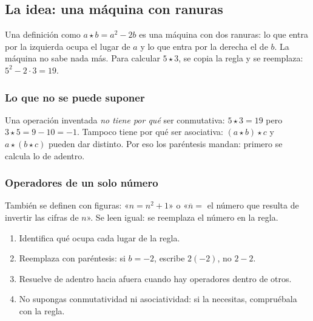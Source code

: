 

\subsection{La idea: una máquina con ranuras}
Una definición como $a \star b = a^2 - 2b$ es una máquina con dos ranuras: lo que entra por la izquierda ocupa el lugar
de $a$ y lo que entra por la derecha el de $b$. La máquina no sabe nada más. Para calcular $5 \star 3$, se copia la regla
y se reemplaza: $5^2 - 2 \cdot 3 = 19$.


\subsubsection{Lo que no se puede suponer}
Una operación inventada \emph{no tiene por qué} ser conmutativa: $5 \star 3 = 19$ pero $3 \star 5 = 9 - 10 = -1$.
Tampoco tiene por qué ser asociativa: $(a \star b)\star c$ y $a \star (b \star c)$ pueden dar distinto. Por eso los
paréntesis mandan: primero se calcula lo de adentro.

\subsubsection{Operadores de un solo número}
También se definen con figuras: «$\boxed{n} = n^2 + 1$» o «$\overline{n} = $ el número que resulta de invertir las
cifras de $n$». Se leen igual: se reemplaza el número en la regla.

\begin{regla}
\begin{enumerate}
  \item Identifica qué ocupa cada lugar de la regla.
  \item Reemplaza con paréntesis: si $b = -2$, escribe $2(-2)$, no $2 - 2$.
  \item Resuelve de adentro hacia afuera cuando hay operadores dentro de otros.
  \item No supongas conmutatividad ni asociatividad: si la necesitas, compruébala con la regla.
\end{enumerate}
\end{regla}

